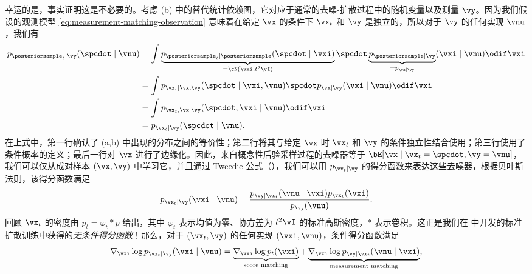 \documentclass[../../book-main_zh.tex]{subfiles}
\begin{document}
幸运的是，事实证明这是不必要的。考虑 (b) 中的替代统计依赖图，它对应于通常的去噪-扩散过程中的随机变量以及测量 $\vy$。因为我们假设的观测模型 \eqref{eq:measurement-matching-observation} 意味着在给定 $\vx$ 的条件下 $\vx_t$ 和 $\vy$ 是独立的，所以对于 $\vy$ 的任何实现 $\vnu$，我们有
\begin{equation}\label{eq:conditional-denoising-conditioning-order-irrelevant}
    \begin{split}
        p_{\posteriorsample_t\mid \vy}(\spcdot \mid \vnu)
        &= \int
        \underbrace{p_{\posteriorsample_t \mid
        \posteriorsample}(\spcdot\mid \vxi)}_{=
        \cN(\vxi, t^2 \vI)}
        \spcdot \underbrace{p_{\posteriorsample \mid \vy}}_{=
        p_{\vx\mid \vy}}(\vxi \mid
        \vnu)
        \odif \vxi
        \\
        &=
        \int p_{\vx_t \mid \vx, \vy}(\spcdot\mid \vxi, \vnu) \spcdot p_{\vx \mid
        \vy}(\vxi\mid \vnu) \odif \vxi
        \\
        &=
        \int p_{\vx_t, \vx \mid \vy}(\spcdot, \vxi \mid \vnu) \odif \vxi
        \\
        &= p_{\vx_t \mid \vy}(\spcdot\mid \vnu).
    \end{split}
\end{equation}
在上式中，第一行确认了  (a,b) 中出现的分布之间的等价性；第二行将其与给定 $\vx$ 时 $\vx_t$ 和 $\vy$ 的条件独立性结合使用；第三行使用了条件概率的定义；最后一行对 $\vx$ 进行了边缘化。因此，来自概念性后验采样过程的去噪器等于 $\bE[\vx \mid \vx_t=\spcdot, \vy=\vnu]$，我们可以仅从成对样本 $(\vx, \vy)$ 中学习它，并且通过 Tweedie 公式（），我们可以用 $p_{\vx_t \mid \vy}$ 的得分函数来表达这些去噪器，根据贝叶斯法则，该得分函数满足
\begin{equation}
    p_{\vx_t \mid \vy}(\vxi \mid \vnu)
    = \frac{p_{\vy \mid \vx_t}(\vnu \mid \vxi) p_{\vx_t}(\vxi)}{p_{\vy}(\vnu)}.
\end{equation}
回顾 $\vx_t$ 的密度由 $p_t = \varphi_{t} \ast p$ 给出，其中 $\varphi_{t}$ 表示均值为零、协方差为 $t^2 \vI$ 的标准高斯密度，$\ast$ 表示卷积。这正是我们在  中开发的标准扩散训练中获得的\textit{无条件得分函数}！那么，对于 $(\vx_t, \vy)$ 的任何实现 $(\vxi, \vnu)$，条件得分函数满足
\begin{equation}
    \nabla_{\vxi} \log p_{\vx_t \mid \vy}(\vxi\mid \vnu)
    =
    \underbrace{\nabla_{\vxi} \log p_t(\vxi)}_{\text{score matching}}
    +
    \underbrace{\nabla_{\vxi} \log p_{\vy \mid \vx_t}(\vnu \mid
    \vxi)}_{\text{measurement matching}},
    \label{eqn:conditional-denoising-score}
\end{equation}
\end{document}
